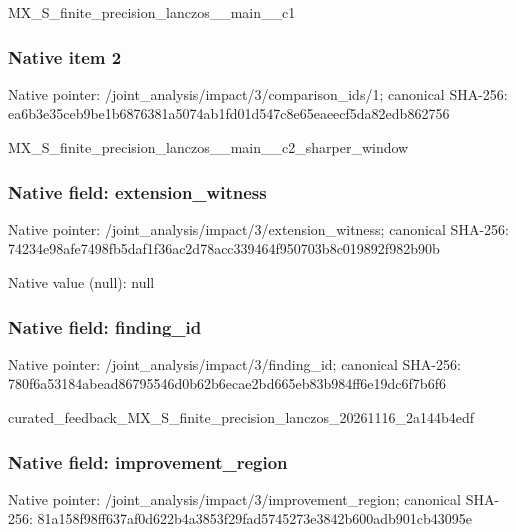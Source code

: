 \documentclass[10pt,a4paper]{article}
\begin{document}
\begingroup\raggedright\sloppy MX\_\allowbreak{}S\_\allowbreak{}finite\_\allowbreak{}precision\_\allowbreak{}lanczos\_\allowbreak{}\_\allowbreak{}main\_\allowbreak{}\_\allowbreak{}c1\par\endgroup

\subsubsection{Native item 2}
Native pointer: /joint\_\allowbreak{}analysis/impact/3/comparison\_\allowbreak{}ids/1; canonical SHA-256: ea6b3e35ceb9be1b6876381a5074ab1fd01d547c8e65eaeecf5da82edb862756

\begingroup\raggedright\sloppy MX\_\allowbreak{}S\_\allowbreak{}finite\_\allowbreak{}precision\_\allowbreak{}lanczos\_\allowbreak{}\_\allowbreak{}main\_\allowbreak{}\_\allowbreak{}c2\_\allowbreak{}sharper\_\allowbreak{}window\par\endgroup

\subsubsection{Native field: extension\_\allowbreak{}witness}
Native pointer: /joint\_\allowbreak{}analysis/impact/3/extension\_\allowbreak{}witness; canonical SHA-256: 74234e98afe7498fb5daf1f36ac2d78acc339464f950703b8c019892f982b90b

Native value (null): null

\subsubsection{Native field: finding\_\allowbreak{}id}
Native pointer: /joint\_\allowbreak{}analysis/impact/3/finding\_\allowbreak{}id; canonical SHA-256: 780f6a53184abead86795546d0b62b6ecae2bd665eb83b984ff6e19dc6f7b6f6

\begingroup\raggedright\sloppy curated\_\allowbreak{}feedback\_\allowbreak{}MX\_\allowbreak{}S\_\allowbreak{}finite\_\allowbreak{}precision\_\allowbreak{}lanczos\_\allowbreak{}20261116\_\allowbreak{}2a144b4edf\par\endgroup

\subsubsection{Native field: improvement\_\allowbreak{}region}
Native pointer: /joint\_\allowbreak{}analysis/impact/3/improvement\_\allowbreak{}region; canonical SHA-256: 81a158f98ff637af0d622b4a3853f29fad5745273e3842b600adb901cb43095e
\end{document}
